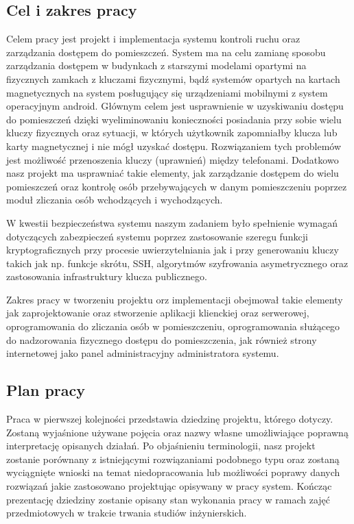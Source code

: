 \subsection{Cel i zakres pracy}

Celem pracy jest projekt i implementacja systemu kontroli ruchu oraz zarządzania dostępem do pomieszczeń. System ma na celu zamianę sposobu zarządzania dostępem w budynkach z starszymi modelami opartymi na fizycznych zamkach z kluczami fizycznymi, bądź systemów opartych na kartach magnetycznych na system posługujący się urządzeniami mobilnymi z system operacyjnym android. Głównym celem jest usprawnienie w uzyskiwaniu dostępu do pomieszczeń dzięki wyeliminowaniu konieczności posiadania przy sobie wielu kluczy fizycznych oraz sytuacji, w których użytkownik zapomniałby klucza lub karty magnetycznej i nie mógł uzyskać dostępu. Rozwiązaniem tych problemów jest możliwość przenoszenia kluczy (uprawnień) między telefonami. Dodatkowo nasz projekt ma usprawniać takie elementy, jak zarządzanie dostępem do wielu pomieszczeń oraz kontrolę osób przebywających w danym pomieszczeniu poprzez moduł zliczania osób wchodzących i wychodzących.
	
W kwestii bezpieczeństwa systemu naszym zadaniem było spełnienie wymagań dotyczących zabezpieczeń systemu poprzez zastosowanie szeregu funkcji kryptograficznych przy procesie uwierzytelniania jak i przy generowaniu kluczy takich jak np. funkcje skrótu, SSH, algorytmów szyfrowania asymetrycznego oraz zastosowania infrastruktury klucza publicznego.

Zakres pracy w tworzeniu projektu orz implementacji obejmował takie elementy jak zaprojektowanie oraz stworzenie aplikacji klienckiej oraz serwerowej, oprogramowania do zliczania osób w pomieszczeniu, oprogramowania służącego do nadzorowania fizycznego dostępu do pomieszczenia, jak również strony internetowej jako panel administracyjny administratora systemu.

\newpage
\subsection{Plan pracy}
Praca w pierwszej kolejności przedstawia dziedzinę projektu, którego dotyczy. Zostaną wyjaśnione używane pojęcia oraz nazwy własne umożliwiające poprawną interpretację opisanych działań. Po objaśnieniu terminologii, nasz projekt zostanie porównany z istniejącymi rozwiązaniami podobnego typu oraz zostaną wyciągnięte wnioski na temat niedopracowania lub możliwości poprawy danych rozwiązań jakie zastosowano projektując opisywany w pracy system. Kończąc prezentację dziedziny zostanie opisany stan wykonania pracy w ramach zajęć przedmiotowych w trakcie trwania studiów inżynierskich.

